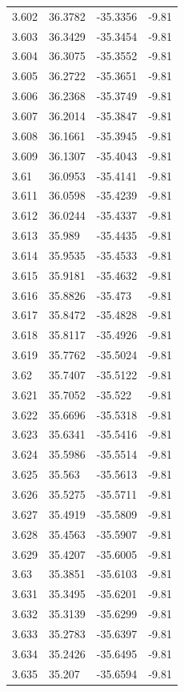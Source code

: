 \begin{tabular}{llll}
3.602 & 36.3782 & -35.3356 & -9.81 \\
3.603 & 36.3429 & -35.3454 & -9.81 \\
3.604 & 36.3075 & -35.3552 & -9.81 \\
3.605 & 36.2722 & -35.3651 & -9.81 \\
3.606 & 36.2368 & -35.3749 & -9.81 \\
3.607 & 36.2014 & -35.3847 & -9.81 \\
3.608 & 36.1661 & -35.3945 & -9.81 \\
3.609 & 36.1307 & -35.4043 & -9.81 \\
3.61 & 36.0953 & -35.4141 & -9.81 \\
3.611 & 36.0598 & -35.4239 & -9.81 \\
3.612 & 36.0244 & -35.4337 & -9.81 \\
3.613 & 35.989 & -35.4435 & -9.81 \\
3.614 & 35.9535 & -35.4533 & -9.81 \\
3.615 & 35.9181 & -35.4632 & -9.81 \\
3.616 & 35.8826 & -35.473 & -9.81 \\
3.617 & 35.8472 & -35.4828 & -9.81 \\
3.618 & 35.8117 & -35.4926 & -9.81 \\
3.619 & 35.7762 & -35.5024 & -9.81 \\
3.62 & 35.7407 & -35.5122 & -9.81 \\
3.621 & 35.7052 & -35.522 & -9.81 \\
3.622 & 35.6696 & -35.5318 & -9.81 \\
3.623 & 35.6341 & -35.5416 & -9.81 \\
3.624 & 35.5986 & -35.5514 & -9.81 \\
3.625 & 35.563 & -35.5613 & -9.81 \\
3.626 & 35.5275 & -35.5711 & -9.81 \\
3.627 & 35.4919 & -35.5809 & -9.81 \\
3.628 & 35.4563 & -35.5907 & -9.81 \\
3.629 & 35.4207 & -35.6005 & -9.81 \\
3.63 & 35.3851 & -35.6103 & -9.81 \\
3.631 & 35.3495 & -35.6201 & -9.81 \\
3.632 & 35.3139 & -35.6299 & -9.81 \\
3.633 & 35.2783 & -35.6397 & -9.81 \\
3.634 & 35.2426 & -35.6495 & -9.81 \\
3.635 & 35.207 & -35.6594 & -9.81 \\

\end{tabular}
